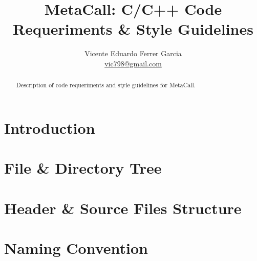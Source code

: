 \documentclass{article}
\begin{document}
% 

\title{MetaCall: C/C++ Code Requeriments \& Style Guidelines}

\author{Vicente Eduardo Ferrer Garcia \\ \href{mailto:vic798@gmail.com}{vic798@gmail.com}}

\maketitle

%

\begin{abstract}
\noindent
Description of code requeriments and style guidelines for MetaCall.
\end{abstract}

\setcounter{tocdepth}{2}
\tableofcontents
\listoffigures
\listoftables

\newpage

% 

\section{Introduction}




%

\newpage

% 

\section{File \& Directory Tree}




%

\newpage

% 

\section{Header \& Source Files Structure}




%

\newpage

% 

\section{Naming Convention}
\end{document}

